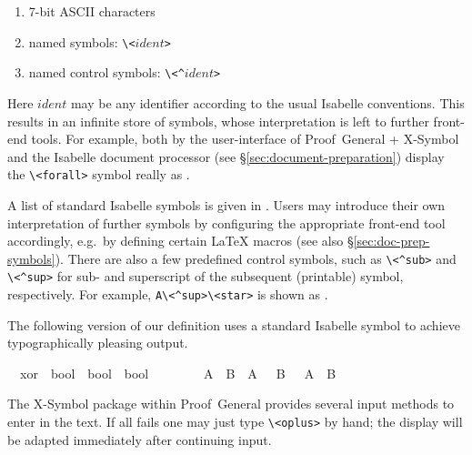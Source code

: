 \begin{isabellebody}
\begin{isamarkuptext}
\begin{enumerate}
  \item 7-bit ASCII characters

  \item named symbols: \verb,\,\verb,<,$ident$\verb,>,

  \item named control symbols: \verb,\,\verb,<^,$ident$\verb,>,

  \end{enumerate}

  Here $ident$ may be any identifier according to the usual Isabelle
  conventions.  This results in an infinite store of symbols, whose
  interpretation is left to further front-end tools.  For example,
  both by the user-interface of Proof~General + X-Symbol and the
  Isabelle document processor (see \S\ref{sec:document-preparation})
  display the \verb,\,\verb,<forall>, symbol really as \isa{{\isasymforall}}.

  A list of standard Isabelle symbols is given in
  \cite[appendix~A]{isabelle-sys}.  Users may introduce their own
  interpretation of further symbols by configuring the appropriate
  front-end tool accordingly, e.g.\ by defining certain {\LaTeX}
  macros (see also \S\ref{sec:doc-prep-symbols}).  There are also a
  few predefined control symbols, such as \verb,\,\verb,<^sub>, and
  \verb,\,\verb,<^sup>, for sub- and superscript of the subsequent
  (printable) symbol, respectively.  For example, \verb,A\<^sup>\<star>, is
  shown as .

  \medskip The following version of our  definition uses a
  standard Isabelle symbol to achieve typographically pleasing output.%
\end{isamarkuptext}%
\isamarkuptrue%
\isamarkupfalse%
\isamarkupfalse%
\isanewline
\ \ xor\ {\isacharcolon}{\isacharcolon}\ {\isachardoublequote}bool\ {\isasymRightarrow}\ bool\ {\isasymRightarrow}\ bool{\isachardoublequote}\ \ \ \ {\isacharparenleft}\ {\isachardoublequote}{\isasymoplus}{\isachardoublequote}\ {}{}{\isacharparenright}\isanewline
\ \ {\isachardoublequote}A\ {\isasymoplus}\ B\ {\isasymequiv}\ {\isacharparenleft}A\ {\isasymand}\ {\isasymnot}\ B{\isacharparenright}\ {\isasymor}\ {\isacharparenleft}{\isasymnot}\ A\ {\isasymand}\ B{\isacharparenright}{\isachardoublequote}\isamarkupfalse%
\isamarkupfalse%
%
\begin{isamarkuptext}%
\noindent The X-Symbol package within Proof~General provides several
  input methods to enter \isa{{\isasymoplus}} in the text.  If all fails one may
  just type \verb,\,\verb,<oplus>, by hand; the display will be
  adapted immediately after continuing input.


\end{isamarkuptext}
\end{isabellebody}
